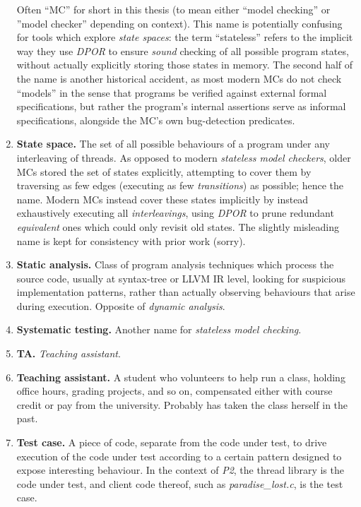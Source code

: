 \begin{enumerate}
		Often ``MC'' for short in this thesis (to mean either ``model checking'' or ''model checker'' depending on context).
		This name is potentially confusing for tools which explore {\em state spaces}:
		the term ``stateless'' refers to the implicit way they use {\em DPOR} to ensure {\em sound} checking
		of all possible program states, without actually explicitly storing those states in memory.
		The second half of the name is another historical accident,
		as most modern MCs do not check ``models'' in the sense that
		programs be verified against external formal specifications,
		but rather the program's internal assertions serve as informal specifications,
		alongside the MC's own bug-detection predicates.
	\item {\bf State space.}
		The set of all possible behaviours of a program under any interleaving of threads.
		As opposed to modern {\em stateless model checkers}, older MCs stored the set of states explicitly,
		attempting to cover them by traversing as few edges (executing as few {\em transitions}) as possible;
		hence the name.
		Modern MCs instead cover these states implicitly by instead exhaustively executing all {\em interleavings},
		using {\em DPOR} to prune redundant {\em equivalent} ones which could only revisit old states.
		The slightly misleading name is kept for consistency with prior work (sorry).
	\item {\bf Static analysis.}
		Class of program analysis techniques which process the source code,
		usually at syntax-tree or LLVM IR level,
		looking for suspicious implementation patterns,
		rather than actually observing behaviours that arise during execution.
		Opposite of {\em dynamic analysis}.
	\item {\bf Systematic testing.}
		Another name for {\em stateless model checking}.
	\item {\bf TA.} {\em Teaching assistant}.
	\item {\bf Teaching assistant.}
		A student who volunteers to help run a class, holding office hours, grading projects, and so on,
		compensated either with course credit or pay from the university.
		Probably has taken the class herself in the past.
	\item {\bf Test case.}
		A piece of code, separate from the code under test,
		to drive execution of the code under test according to a certain pattern designed to expose interesting behaviour.
		In the context of {\em P2}, the thread library is the code under test,
		and client code thereof, such as {\em paradise\_lost.c}, is the test case.

\end{enumerate}
